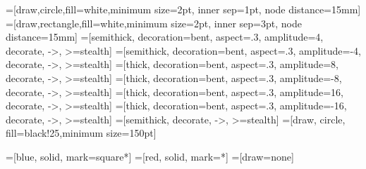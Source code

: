 \usepackage{pgf}
\usepackage{tikz}
\usetikzlibrary{decorations.pathmorphing} %
\usetikzlibrary{positioning}
\usetikzlibrary{er}
\usetikzlibrary{automata}
\usetikzlibrary{shapes.geometric}
=[draw,circle,fill=white,minimum size=2pt, inner sep=1pt, node distance=15mm]
=[draw,rectangle,fill=white,minimum size=2pt, inner sep=3pt, node distance=15mm]
=[semithick, decoration={bent, aspect=.3, amplitude=4}, decorate, ->, >=stealth]
=[semithick, decoration={bent, aspect=.3, amplitude=-4}, decorate, ->, >=stealth]
=[thick, decoration={bent, aspect=.3, amplitude=8}, decorate, ->, >=stealth]
=[thick, decoration={bent, aspect=.3, amplitude=-8}, decorate, ->, >=stealth]
=[thick, decoration={bent, aspect=.3, amplitude=16}, decorate, ->, >=stealth]
=[thick, decoration={bent, aspect=.3, amplitude=-16}, decorate, ->, >=stealth]
=[semithick, decorate, ->, >=stealth]
=[draw, circle, fill=black!25,minimum size=150pt]

=[blue, solid, mark=square*]
=[red, solid, mark=*]
=[draw=none]
